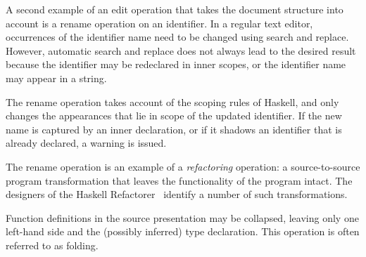 
A second example of an edit operation that takes the document structure into account is a rename operation on an identifier. In a regular text editor, occurrences of the identifier name need to be changed using search and replace. However, automatic search and replace does not always lead to the desired result because the identifier may be redeclared in inner scopes, or the identifier name may appear in a string.


The rename operation takes account of the scoping rules of Haskell, and only changes the appearances that lie in scope of the updated identifier. If the new name is captured by an inner declaration, or if it shadows an identifier that is already declared, a warning is issued.

The rename operation is an example of a {\em refactoring} operation: a source-to-source program transformation that leaves  the functionality of the program intact. The designers of the Haskell Refactorer~\cite{reinke03refactoring} identify a number of such transformations.


Function definitions in the source presentation may be collapsed, leaving only one left-hand side and the (possibly inferred) type declaration. This operation is often referred to as folding.

